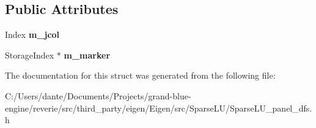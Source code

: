 \subsection*{Public Attributes}
\begin{DoxyCompactItemize}
\item 
\mbox{\label{struct_eigen_1_1internal_1_1panel__dfs__traits_ad35e09680a023ee42628342b1c166047}} 
Index {\bfseries m\+\_\+jcol}
\item 
\mbox{\label{struct_eigen_1_1internal_1_1panel__dfs__traits_a963e0dcd500fdb333ec6ea40217dcf93}} 
Storage\+Index $\ast$ {\bfseries m\+\_\+marker}
\end{DoxyCompactItemize}


The documentation for this struct was generated from the following file\+:\begin{DoxyCompactItemize}
\item 
C\+:/\+Users/dante/\+Documents/\+Projects/grand-\/blue-\/engine/reverie/src/third\+\_\+party/eigen/\+Eigen/src/\+Sparse\+L\+U/Sparse\+L\+U\+\_\+panel\+\_\+dfs.\+h\end{DoxyCompactItemize}
